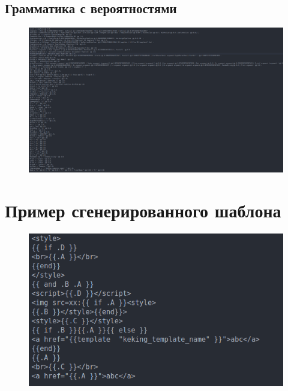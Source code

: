 \documentclass[a4paper]{article}
\begin{document}
\begin{landscape}
\section{Грамматика с вероятностями}

\begin{figure}[ht!]
    \includegraphics[width=260mm]{probabilities.png}
    \label{Probabilities}
    \end{figure}
\end{landscape}

\section{Пример сгенерированного шаблона}

\begin{figure}[ht!]
    \includegraphics[width=170mm]{Template.png}
    \label{GeneratedTemplate}
    \end{figure}
\end{document}

